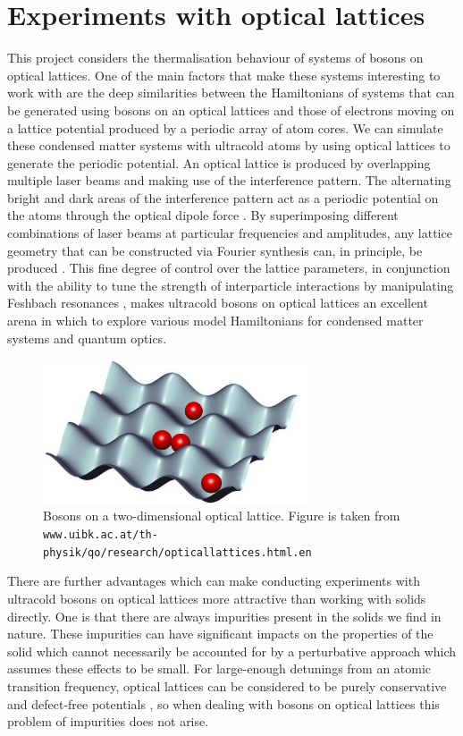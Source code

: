 \documentclass[a4paper, 10pt]{article}
\theoremstyle{plain}
\begin{document}
\section{Experiments with optical lattices}

This project considers the thermalisation behaviour of systems of bosons on
optical lattices. One of the main factors that make these systems interesting
to work with are the deep similarities between the Hamiltonians of systems that
can be generated using bosons on an optical lattices and those of electrons
moving on a lattice potential produced by a periodic array of atom cores. We can
simulate these condensed matter systems with ultracold atoms by using optical
lattices to generate the periodic potential. An optical lattice is produced by
overlapping multiple laser beams and making use of the interference pattern.
The alternating bright and dark areas of the interference pattern act as a
periodic potential on the atoms through the optical dipole force
\cite{Bloch2012}. By superimposing different combinations of laser beams at
particular frequencies and amplitudes, any lattice geometry that can be
constructed via Fourier synthesis can, in principle, be produced
\cite{Bloch2012}. This fine degree of control over the lattice parameters, in
conjunction with the ability to tune the strength of interparticle interactions
by manipulating Feshbach resonances \cite{Chin2010}, makes ultracold bosons on
optical lattices an excellent arena in which to explore various model
Hamiltonians for condensed matter systems and quantum optics.
\begin{figure}[bh!]
    \begin{center}
        \includegraphics[width=8cm]{bosons_on_lattice}
    \end{center}
    \caption{Bosons on a two-dimensional optical lattice. Figure is taken from\newline
             \texttt{www.uibk.ac.at/th-physik/qo/research/opticallattices.html.en}
            }
\end{figure}
There are further advantages which can make conducting experiments with
ultracold bosons on optical lattices more attractive than working with solids
directly. One is that there are always impurities present in the solids we find
in nature. These impurities can have significant impacts on the properties of
the solid which cannot necessarily be accounted for by a perturbative approach
which assumes these effects to be small. For large-enough detunings from an atomic
transition frequency, optical lattices can be considered to be purely
conservative and defect-free potentials \cite{Bloch2012}, so when dealing with
bosons on optical lattices this problem of impurities does not arise.
\end{document}
